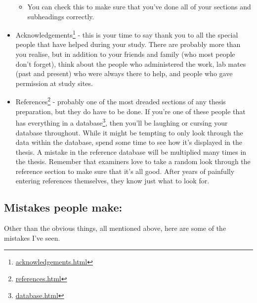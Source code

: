 \documentclass[
]{krantz}
\providecommand{\tightlist}{%
  \setlength{\itemsep}{0pt}\setlength{\parskip}{0pt}}
\renewcommand{\href}[2]{#2\footnote{\url{#1}}}
\begin{document}
\begin{itemize}
  \begin{itemize}
  \tightlist
  \item
    You can check this to make sure that you've done all of your sections and subheadings correctly.
  \end{itemize}
\item
  \href{acknowledgements.html}{Acknowledgements} - this is your time to say thank you to all the special people that have helped during your study. There are probably more than you realise, but in addition to your friends and family (who most people don't forget), think about the people who administered the work, lab mates (past and present) who were always there to help, and people who gave permission at study sites.
\item
  \href{references.html}{References} - probably one of the most dreaded sections of any thesis preparation, but they do have to be done. If you're one of these people that has everything in a \href{database.html}{database}, then you'll be laughing or cursing your database throughout. While it might be tempting to only look through the data within the database, spend some time to see how it's displayed in the thesis. A mistake in the reference database will be multiplied many times in the thesis. Remember that examiners love to take a random look through the reference section to make sure that it's all good. After years of painfully entering references themselves, they know just what to look for.
\end{itemize}

\hypertarget{mistakes-people-make}{%
\subsection{Mistakes people make:}\label{mistakes-people-make}}

Other than the obvious things, all mentioned above, here are some of the mistakes I've seen.
\end{document}
